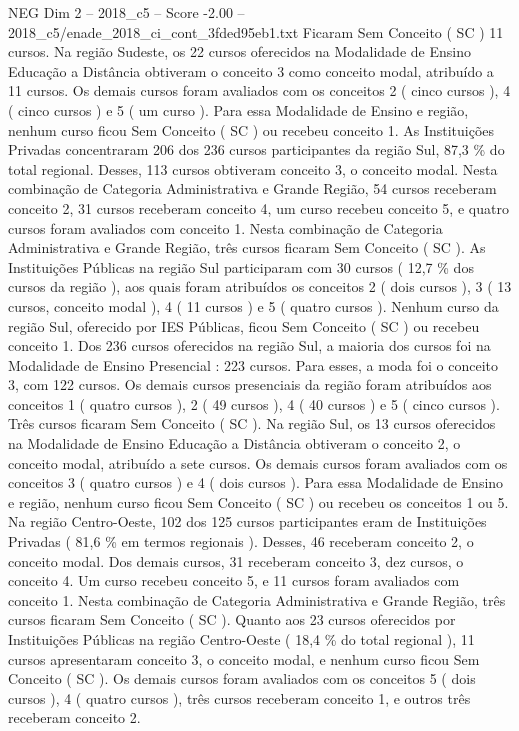\begin{textsample}{NEG Dim 2 – 2018\_c5 – Score -2.00 – 2018\_c5/enade\_2018\_ci\_cont\_3fded95eb1.txt}
Ficaram Sem Conceito ( SC ) 11 cursos.
Na região Sudeste, os 22 cursos oferecidos na Modalidade de Ensino Educação a Distância obtiveram o conceito 3 como conceito modal, atribuído a 11 cursos.
Os demais cursos foram avaliados com os conceitos 2 ( cinco cursos ), 4 ( cinco cursos ) e 5 ( um curso ).
Para essa Modalidade de Ensino e região, nenhum curso ficou Sem Conceito ( SC ) ou recebeu conceito 1.
As Instituições Privadas concentraram 206 dos 236 cursos participantes da região Sul, 87,3 \% do total regional.
Desses, 113 cursos obtiveram conceito 3, o conceito modal.
Nesta combinação de Categoria Administrativa e Grande Região, 54 cursos receberam conceito 2, 31 cursos receberam conceito 4, um curso recebeu conceito 5, e quatro cursos foram avaliados com conceito 1.
Nesta combinação de Categoria Administrativa e Grande Região, três cursos ficaram Sem Conceito ( SC ).
As Instituições Públicas na região Sul participaram com 30 cursos ( 12,7 \% dos cursos da região ), aos quais foram atribuídos os conceitos 2 ( dois cursos ), 3 ( 13 cursos, conceito modal ), 4 ( 11 cursos ) e 5 ( quatro cursos ).
Nenhum curso da região Sul, oferecido por IES Públicas, ficou Sem Conceito ( SC ) ou recebeu conceito 1.
Dos 236 cursos oferecidos na região Sul, a maioria dos cursos foi na Modalidade de Ensino Presencial : 223 cursos.
Para esses, a moda foi o conceito 3, com 122 cursos.
Os demais cursos presenciais da região foram atribuídos aos conceitos 1 ( quatro cursos ), 2 ( 49 cursos ), 4 ( 40 cursos ) e 5 ( cinco cursos ).
Três cursos ficaram Sem Conceito ( SC ).
Na região Sul, os 13 cursos oferecidos na Modalidade de Ensino Educação a Distância obtiveram o conceito 2, o conceito modal, atribuído a sete cursos.
Os demais cursos foram avaliados com os conceitos 3 ( quatro cursos ) e 4 ( dois cursos ).
Para essa Modalidade de Ensino e região, nenhum curso ficou Sem Conceito ( SC ) ou recebeu os conceitos 1 ou 5.
Na região Centro-Oeste, 102 dos 125 cursos participantes eram de Instituições Privadas ( 81,6 \% em termos regionais ).
Desses, 46 receberam conceito 2, o conceito modal.
Dos demais cursos, 31 receberam conceito 3, dez cursos, o conceito 4.
Um curso recebeu conceito 5, e 11 cursos foram avaliados com conceito 1.
Nesta combinação de Categoria Administrativa e Grande Região, três cursos ficaram Sem Conceito ( SC ).
Quanto aos 23 cursos oferecidos por Instituições Públicas na região Centro-Oeste ( 18,4 \% do total regional ), 11 cursos apresentaram conceito 3, o conceito modal, e nenhum curso ficou Sem Conceito ( SC ).
Os demais cursos foram avaliados com os conceitos 5 ( dois cursos ), 4 ( quatro cursos ), três cursos receberam conceito 1, e outros três receberam conceito 2.

\end{textsample}
